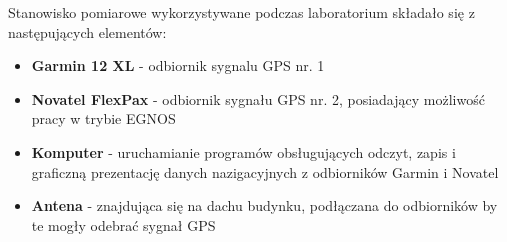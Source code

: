 \akapit Stanowisko pomiarowe wykorzystywane podczas laboratorium składało się z następujących elementów:

\begin{itemize}
    \item \textbf{Garmin 12 XL} - odbiornik sygnalu GPS nr. 1
    \item \textbf{Novatel FlexPax} - odbiornik sygnału GPS nr. 2, posiadający możliwość pracy w trybie EGNOS
    \item \textbf{Komputer} - uruchamianie programów obsługujących odczyt, zapis i graficzną prezentację danych nazigacyjnych z odbiorników Garmin i Novatel
    \item \textbf{Antena} - znajdująca się na dachu budynku, podłączana do odbiorników by te mogły odebrać sygnał GPS
\end{itemize}